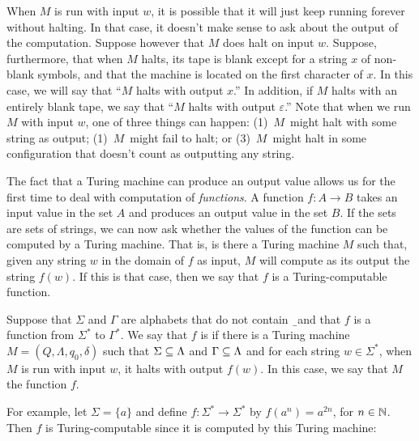 When $M$ is run with input $w$, it is possible that it will just keep
running forever without halting.  In that case, it doesn't make
sense to ask about the output of the computation.  Suppose however
that $M$ does halt on input $w$.  Suppose, furthermore, that when
$M$ halts, its tape is blank except for a string $x$ of non-blank
symbols, and that the machine is located on the first character
of $x$.  In this case, we will say that ``$M$ halts with output $x$.''
In addition, if $M$ halts with an entirely blank tape, we say that
``$M$ halts with output $\varepsilon$.''
Note that when we run $M$ with input $w$, one of three things can happen:
(1)~$M$~might halt with some string as output; (1)~$M$~might fail to halt; 
or (3)~$M$~might halt in some configuration that doesn't
count as outputting any string.

The fact that a Turing machine can produce an output value allows us
for the first time to deal with computation of \textit{functions}.
A function $f\colon A\to B$ takes an input value in the set $A$
and produces an output value in the set $B$.  If the sets are sets
of strings, we can now ask whether the values of the function can
be computed by a Turing machine.  That is, is there a Turing machine $M$
such that, given any string $w$ in the domain of $f$ as input,
$M$ will compute as its output the string $f(w)$.  If this is
that case, then we say that $f$ is a Turing-computable function.
\begin{definition} Suppose
that $\Sigma$ and $\Gamma$ are alphabets that do not contain \b\ and that
$f$ is a function from $\Sigma^*$ to $\Gamma^*$.  We say that
$f$ is  if there is a Turing machine
$M=(Q,\Lambda,q_0,\delta)$ such that $\Sigma\subseteq\Lambda$ and $\Gamma\subseteq\Lambda$
and for each string $w\in\Sigma^*$, when $M$ is run with input $w$,
it halts with output $f(w)$.  In this case, we say that $M$
 the function $f$.
\end{definition}
\noindent For example, let $\Sigma=\{a\}$ and define $f\colon\Sigma^*\to\Sigma^*$
by $f(a^n)=a^{2n}$, for $n\in{\mathbb N}$.  Then $f$ is Turing-computable
since it is computed by this Turing machine:

\medbreak

\breakSixByNine


